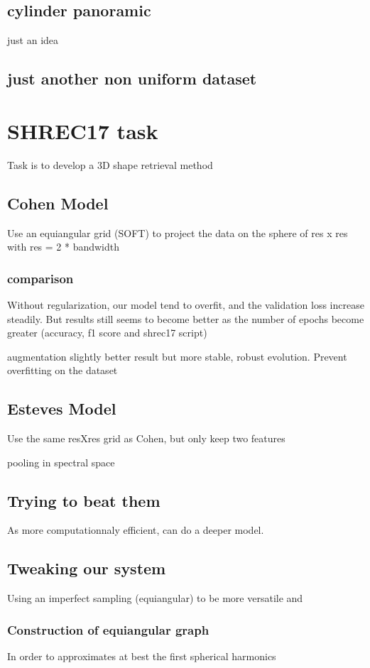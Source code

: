 \documentclass[11pt]{report}
\begin{document}
\subsection{cylinder panoramic}
just an idea
\subsection{just another non uniform dataset}

\section{SHREC17 task}
Task is to develop a 3D shape retrieval method
\subsection{Cohen Model}
Use an equiangular grid (SOFT) to project the data on the sphere of res x res with res = 2 * bandwidth

\subsubsection{comparison}
Without regularization, our model tend to overfit, and the validation loss increase steadily. But results still seems to become better as the number of epochs become greater (accuracy, f1 score and shrec17 script)

augmentation slightly better result but more stable, robust evolution. Prevent overfitting on the dataset
\subsection{Esteves Model}
Use the same resXres grid as Cohen, but only keep two features

pooling in spectral space
\subsection{Trying to beat them}
As more computationnaly efficient, can do a deeper model.

\subsection{Tweaking our system}
Using an imperfect sampling (equiangular) to be more versatile and 
\subsubsection{Construction of equiangular graph}
In order to approximates at best the first spherical harmonics
\end{document}
